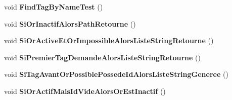 \begin{DoxyCompactItemize}
void {\bfseries Find\+Tag\+By\+Name\+Test} ()
\item 
\mbox{\label{class_m_t_connect_agent_1_1_b_l_l_1_1_tests_1_1_m_t_connect_client_tests_a15ed0ae2e7431dd7d5e293da40e3f4d8}} 
void {\bfseries Si\+Or\+Inactif\+Alors\+Path\+Retourne} ()
\item 
\mbox{\label{class_m_t_connect_agent_1_1_b_l_l_1_1_tests_1_1_m_t_connect_client_tests_ae9836699db3c3966233750df927069a2}} 
void {\bfseries Si\+Or\+Active\+Et\+Or\+Impossible\+Alors\+Liste\+String\+Retourne} ()
\item 
\mbox{\label{class_m_t_connect_agent_1_1_b_l_l_1_1_tests_1_1_m_t_connect_client_tests_ac5a0bfeb3dd1dc2f2b5d8235a7bddb4c}} 
void {\bfseries Si\+Premier\+Tag\+Demande\+Alors\+Liste\+String\+Retourne} ()
\item 
\mbox{\label{class_m_t_connect_agent_1_1_b_l_l_1_1_tests_1_1_m_t_connect_client_tests_a22ed7e734c0678f8fbcb037da9ad05cf}} 
void {\bfseries Si\+Tag\+Avant\+Or\+Possible\+Possede\+Id\+Alors\+Liste\+String\+Generee} ()
\item 
\mbox{\label{class_m_t_connect_agent_1_1_b_l_l_1_1_tests_1_1_m_t_connect_client_tests_a27a0ad4eed0ad982ca3e93c793f6bb2c}} 
void {\bfseries Si\+Or\+Actif\+Mais\+Id\+Vide\+Alors\+Or\+Est\+Inactif} ()
\end{DoxyCompactItemize}
